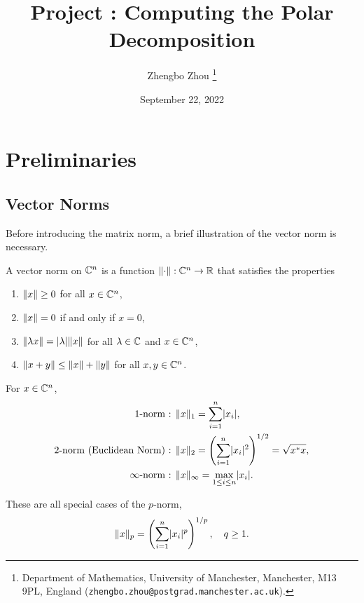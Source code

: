 \documentclass[12pt]{article}
\title{Project : Computing the Polar Decomposition}
\author{Zhengbo Zhou%
    \thanks{%
        Department of Mathematics,
        University of Manchester,
        Manchester, M13 9PL, England
        (\texttt{zhengbo.zhou@postgrad.manchester.ac.uk}).
    }
}
\date{September 22, 2022}
\begin{document}
\maketitle


\section{Preliminaries}\label{sec:norms-svd}

\subsection{Vector Norms} \label{subsec:vector-norms}

Before introducing the matrix norm, a brief illustration of the vector norm is necessary.

\begin{definition}
   \label{def:vector-norm}
  A vector norm on $\mathbb{C}^n$ is a function $\|{\cdot}\| : \mathbb{C}^n \to \mathbb{R}$  that  satisfies the  properties
  \begin{enumerate}
    \item $\|{x}\| \geq 0$ for all $x\in\mathbb{C}^n$,
    \item $\|{x}\| = 0$ if and only if $x = 0$,
    \item $\|{\lambda x}\| = \lvert\lambda\rvert \|{x}\|$ for all $\lambda \in \mathbb{C}$ and $x \in \mathbb{C}^n$,
    \item $\|{x + y}\| \leq \|{x}\| + \|{y}\|$ for all $x,y\in \mathbb{C}^n$.
  \end{enumerate}
\end{definition}

\begin{example}
    For $x\in\mathbb{C}^n$, 
    \begin{equation}\notag
        \begin{aligned}
            \text{1-norm : }& \|{x}\|_1 = \sum_{i = 1}^n \lvert x_i\rvert,\\
            \text{2-norm (Euclidean Norm) : }& \|{x}\|_2 = \left(\sum_{i = 1}^n \lvert x_i\rvert^2\right)^{1/2} = \sqrt{x^* x},\\
            \text{$\infty$-norm : } & \|{x}\|_{\infty} = \max_{1\leq i \leq n} \lvert x_i\rvert.
        \end{aligned}
    \end{equation}
    
    These are all special cases of the $p$-norm,
    \begin{equation}\label{eq:vector-p-norm}
        \|{x}\|_p = \left(\sum_{i = 1}^n \lvert x_i\rvert^p\right)^{1/p},\quad q \geq 1.
    \end{equation}
\end{example}
\end{document}
